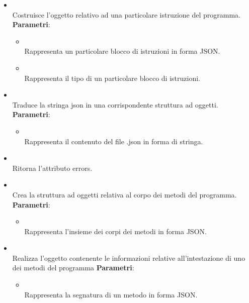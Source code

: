 \begin{itemize}
\begin{itemize}
\item {}
\\ Costruisce l'oggetto relativo ad una particolare istruzione del programma.
\textbf{Parametri}:
\begin{itemize}
\item {}
\\ Rappresenta un particolare blocco di istruzioni in forma JSON.
\item {}
\\ Rappresenta il tipo di un particolare blocco di istruzioni.
\end{itemize}
\item {}
\\ Traduce la stringa json in una corrispondente struttura ad oggetti.
\textbf{Parametri}:
\begin{itemize}
\item {}
\\ Rappresenta il contenuto del file .json in forma di stringa.
\end{itemize}
\item {}
\\ Ritorna l'attributo errors.
\item {}
\\ Crea la struttura ad oggetti relativa al corpo dei metodi del programma.
\textbf{Parametri}:
\begin{itemize}
\item {}
\\ Rappresenta l'insieme dei corpi dei metodi in forma JSON.
\end{itemize}
\item {}
\\ Realizza l'oggetto contenente le informazioni relative all'intestazione di uno dei metodi del programma
\textbf{Parametri}:
\begin{itemize}
\item {}
\\ Rappresenta la segnatura di un metodo in forma JSON.

\end{itemize}
\end{itemize}
\end{itemize}
